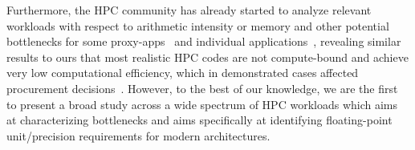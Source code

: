 \begin{comment}
\struc{similar FP studies}

\struc{other hardware directions}

\struc{alternative metrics for procurement}

\struc{studies on HPC usage categorized by science field and/or workload, such as stencils}

\struc{studies of dedicated purpose machines, such as weather, and how/why they choose certain architectures, like more memory, etc}
\end{comment}

Furthermore, the HPC community has already started to analyze relevant workloads with respect to arithmetic
intensity or memory and other potential bottlenecks for some proxy-apps~
\cite{aaziz_methodology_2018,asifuzzaman_report_2017,koskela_novel_2018}
and individual applications~\cite{culpo_current_2012,tramm_memory_2015,kumahata_kernel_2013},
revealing similar results to ours that most realistic HPC codes are not compute-bound and
achieve very low computational efficiency,
which in demonstrated cases affected procurement decisions~\cite{saini_performance_2016}.
However, to the best of our knowledge, we are the first to present a broad study across a
wide spectrum of HPC workloads which aims at characterizing bottlenecks and aims
specifically at identifying floating-point unit/precision requirements for modern architectures.
